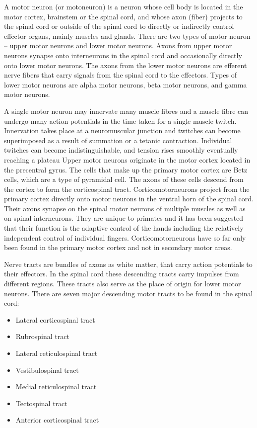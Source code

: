 A motor neuron (or motoneuron) is a neuron whose cell body is located in the motor cortex, brainstem or the spinal cord, and whose axon (fiber) projects to the spinal cord or outside of the spinal cord to directly or indirectly control effector organs, mainly muscles and glands. There are two types of motor neuron -- upper motor neurons and lower motor neurons. Axons from upper motor neurons synapse onto interneurons in the spinal cord and occasionally directly onto lower motor neurons. The axons from the lower motor neurons are efferent nerve fibers that carry signals from the spinal cord to the effectors. Types of lower motor neurons are alpha motor neurons, beta motor neurons, and gamma motor neurons.

A single motor neuron may innervate many muscle fibres and a muscle fibre can undergo many action potentials in the time taken for a single muscle twitch. Innervation takes place at a neuromuscular junction and twitches can become superimposed as a result of summation or a tetanic contraction. Individual twitches can become indistinguishable, and tension rises smoothly eventually reaching a plateau
Upper motor neurons originate in the motor cortex located in the precentral gyrus. The cells that make up the primary motor cortex are Betz cells, which are a type of pyramidal cell. The axons of these cells descend from the cortex to form the corticospinal tract. Corticomotorneurons project from the primary cortex directly onto motor neurons in the ventral horn of the spinal cord. Their axons synapse on the spinal motor neurons of multiple muscles as well as on spinal interneurons. They are unique to primates and it has been suggested that their function is the adaptive control of the hands including the relatively independent control of individual fingers. Corticomotorneurons have so far only been found in the primary motor cortex and not in secondary motor areas.

Nerve tracts are bundles of axons as white matter, that carry action potentials to their effectors. In the spinal cord these descending tracts carry impulses from different regions. These tracts also serve as the place of origin for lower motor neurons. There are seven major descending motor tracts to be found in the spinal cord:

\begin{itemize}
\tightlist
\item
  Lateral corticospinal tract
\item
  Rubrospinal tract
\item
  Lateral reticulospinal tract
\item
  Vestibulospinal tract
\item
  Medial reticulospinal tract
\item
  Tectospinal tract
\item
  Anterior corticospinal tract
\end{itemize}

